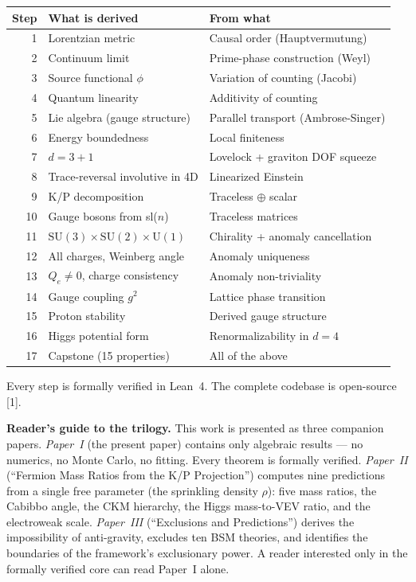 \documentclass[11pt,letterpaper]{article}
\begin{document}
\begin{center}
\begin{tabular}{@{}rll@{}}
\toprule
Step & What is derived & From what \\
\midrule
1 & Lorentzian metric & Causal order (Hauptvermutung) \\
2 & Continuum limit & Prime-phase construction (Weyl) \\
3 & Source functional $\phi$ & Variation of counting (Jacobi) \\
4 & Quantum linearity & Additivity of counting \\
5 & Lie algebra (gauge structure) & Parallel transport (Ambrose-Singer) \\
6 & Energy boundedness & Local finiteness \\
7 & $d = 3{+}1$ & Lovelock + graviton DOF squeeze \\
8 & Trace-reversal involutive in 4D & Linearized Einstein \\
9 & K/P decomposition & Traceless $\oplus$ scalar \\
10 & Gauge bosons from sl($n$) & Traceless matrices \\
11 & $\mathrm{SU}(3) \times \mathrm{SU}(2) \times \mathrm{U}(1)$ &
  Chirality + anomaly cancellation \\
12 & All charges, Weinberg angle & Anomaly uniqueness \\
13 & $Q_e \neq 0$, charge consistency & Anomaly non-triviality \\
14 & Gauge coupling $g^2$ & Lattice phase transition \\
15 & Proton stability & Derived gauge structure \\
16 & Higgs potential form & Renormalizability in $d = 4$ \\
17 & Capstone (15 properties) & All of the above \\
\bottomrule
\end{tabular}
\end{center}

\noindent Every step is formally verified in Lean~4.  The complete
codebase is open-source [1].

\medskip
\noindent\textbf{Reader's guide to the trilogy.}
This work is presented as three companion papers.
\emph{Paper~I} (the present paper) contains only algebraic results ---
no numerics, no Monte Carlo, no fitting.  Every theorem is formally
verified.
\emph{Paper~II} (``Fermion Mass Ratios from the K/P Projection'')
computes nine predictions from a single free parameter
(the sprinkling density $\rho$): five mass ratios, the
Cabibbo angle, the CKM hierarchy, the Higgs mass-to-VEV ratio, and
the electroweak scale.
\emph{Paper~III} (``Exclusions and Predictions'') derives the
impossibility of anti-gravity, excludes ten BSM theories, and
identifies the boundaries of the framework's exclusionary power.
A reader interested only in the formally verified core can read
Paper~I alone.
\end{document}
